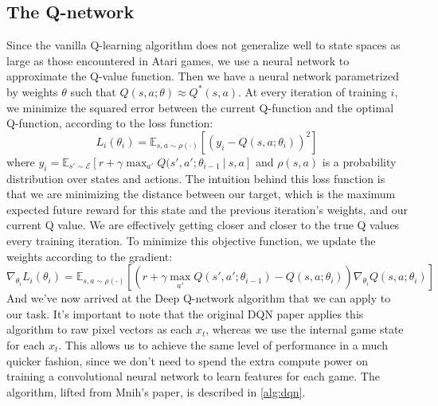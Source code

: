 \documentclass{article}
\begin{document}
\subsection{The Q-network}
Since the vanilla Q-learning algorithm does not generalize well to state spaces as large as those encountered in Atari games, we use a neural network to approximate the Q-value function. 
Then we have a neural network parametrized by weights $\theta$ such that $Q(s, a; \theta) \approx Q^{*}(s, a)$.
At every iteration of training $i$, we minimize the squared error between the current Q-function and the optimal Q-function, according to the loss function:
\begin{equation}
\displaystyle L_i(\theta_i) = \mathbb{E}_{s, a \sim \rho(\cdot)}[(y_i - Q(s, a; \theta_i))^2]
\end{equation}
where $y_i = \mathbb{E}_{s' \sim \mathcal{E}}[r + \gamma\max_{a'}Q(s', a'; \theta_{i - 1}\ |\ s, a]$ and $\rho(s, a)$ is a probability distribution over states and actions. 
The intuition behind this loss function is that we are minimizing the distance between our target, which is the maximum expected future reward for this state and the previous iteration's weights, and our current Q value.
We are effectively getting closer and closer to the true Q values every training iteration.
To minimize this objective function, we update the weights according to the gradient:
\begin{equation}
\displaystyle \nabla_{\theta_i}L_i(\theta_i) = \mathbb{E}_{s, a \sim \rho(\cdot)}[(r + \gamma \max_{a'}Q(s', a'; \theta_{i - 1}) - Q(s, a; \theta_i))\nabla_{\theta_i}Q(s, a; \theta_i)]
\end{equation}
And we've now arrived at the Deep Q-network algorithm that we can apply to our task.
It's important to note that the original DQN paper applies this algorithm to raw pixel vectors as each $x_t$, whereas we use the internal game state for each $x_t$.
This allows us to achieve the same level of performance in a much quicker fashion, since we don't need to spend the extra compute power on training a convolutional neural network to learn features for each game.
The algorithm, lifted from Mnih's paper, is described in \ref{alg:dqn}.
\end{document}
